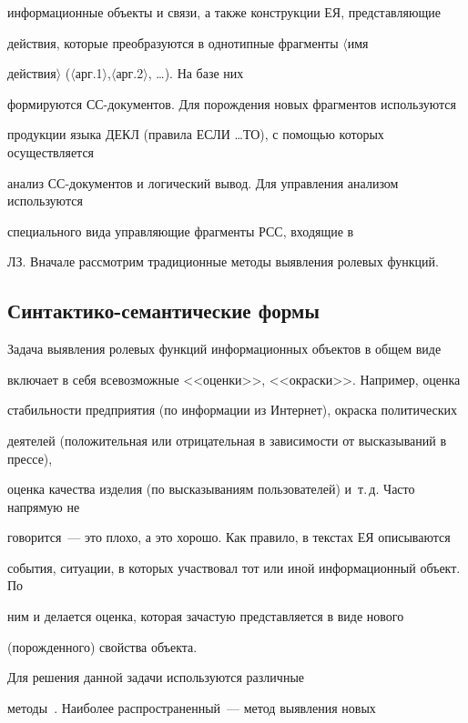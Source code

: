 информационные объекты и связи, а также конструкции ЕЯ, представляющие 


действия, которые преобразуются в однотипные фрагменты $\langle$имя 


действия$\rangle$ ($\langle $арг.1$\rangle$,$\langle$арг.2$\rangle$, \ldots). На базе них 


формируются СС-документов. Для  порождения новых фрагментов используются  


продукции языка ДЕКЛ (правила ЕСЛИ \ldots ТО), с помощью которых осуществляется 


анализ СС-документов и логический вывод. Для управления анализом используются 


специального вида управляющие фрагменты РСС, входящие в  


ЛЗ. Вначале рассмотрим традиционные методы выявления ролевых функций.





\subsection{Синтактико-семантические формы}


      


         Задача выявления ролевых функций информационных объектов в общем виде 


включает в себя всевозможные <<оценки>>, <<окраски>>. Например, оценка 


стабильности предприятия (по информации из Интернет), окраска политических 


деятелей (положительная или отрицательная в зависимости от высказываний в прессе), 


оценка качества изделия (по высказываниям пользователей) и~т.\,д. Часто напрямую не 


говорится~--- это плохо, а это хорошо. Как правило, в текстах ЕЯ описываются 


события, ситуации, в которых участвовал тот или иной информационный объект. По 


ним и делается оценка, которая зачастую представляется в виде нового 


(порожденного) свойства объекта.  





         Для решения данной задачи используются различные 


методы~\cite{12-2-10, 11-2-10}. Наиболее распространенный~--- метод выявления новых 


